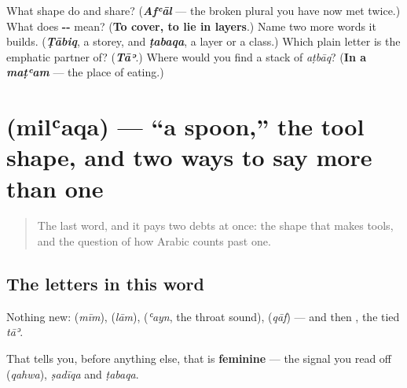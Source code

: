 \begin{tcolorbox}[breakable,colback=teal!4,colframe=teal!35!black,title={Before you move on}]
What shape do \textbf{} and \textbf{} share? (\emph{\textbf{Afʿāl}} — the broken plural you have now met twice.) What does \textbf{--} mean? (\textbf{To cover, to lie in layers}.) Name two more words it builds. (\emph{\textbf{Ṭābiq}}, a storey, and \emph{\textbf{ṭabaqa}}, a layer or a class.) Which plain letter is \textbf{} the emphatic partner of? (\emph{\textbf{Tāʾ}}.) Where would you find a stack of \emph{aṭbāq}? (\textbf{In a \emph{maṭʿam}} — the place of eating.)
\end{tcolorbox}
\section[\texorpdfstring{\ar{ملعقة} (milʿaqa)}{ملعقة (milʿaqa)}]{ (milʿaqa) — \textquotedblleft{}a spoon,\textquotedblright{} the tool shape, and two ways to say more than one}

\label{lesson:AR-C36-milaqa}



\begin{quote}
The last word, and it pays two debts at once: the shape that makes tools, and the question of how Arabic counts past one.
\end{quote}

\subsection*{The letters in this word}
Nothing new: \textbf{} (\emph{mīm}), \textbf{} (\emph{lām}), \textbf{} (\emph{ʿayn}, the throat sound), \textbf{} (\emph{qāf}) — and then \textbf{}, the tied \emph{tāʾ}.

That \textbf{} tells you, before anything else, that \textbf{} is \textbf{feminine} — the signal you read off \textbf{} (\emph{qahwa}), \emph{ṣadīqa} and \emph{ṭabaqa}.

